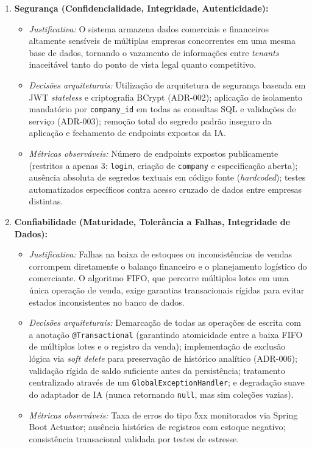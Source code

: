 \documentclass[12pt,a4paper]{article}
\begin{document}
\begin{enumerate}
    \item \textbf{Segurança (Confidencialidade, Integridade, Autenticidade):}
    \begin{itemize}
        \item \textit{Justificativa:} O sistema armazena dados comerciais e financeiros altamente sensíveis de múltiplas empresas concorrentes em uma mesma base de dados, tornando o vazamento de informações entre \textit{tenants} inaceitável tanto do ponto de vista legal quanto competitivo.
        \item \textit{Decisões arquiteturais:} Utilização de arquitetura de segurança baseada em JWT \textit{stateless} e criptografia BCrypt (ADR-002); aplicação de isolamento mandatório por \texttt{company\_id} em todas as consultas SQL e validações de serviço (ADR-003); remoção total do segredo padrão inseguro da aplicação e fechamento de endpoints expostos da IA.
        \item \textit{Métricas observáveis:} Número de endpoints expostos publicamente (restritos a apenas 3: \texttt{login}, criação de \texttt{company} e especificação aberta); ausência absoluta de segredos textuais em código fonte (\textit{hardcoded}); testes automatizados específicos contra acesso cruzado de dados entre empresas distintas.
    \end{itemize}

    \item \textbf{Confiabilidade (Maturidade, Tolerância a Falhas, Integridade de Dados):}
    \begin{itemize}
        \item \textit{Justificativa:} Falhas na baixa de estoques ou inconsistências de vendas corrompem diretamente o balanço financeiro e o planejamento logístico do comerciante. O algoritmo FIFO, que percorre múltiplos lotes em uma única operação de venda, exige garantias transacionais rígidas para evitar estados inconsistentes no banco de dados.
        \item \textit{Decisões arquiteturais:} Demarcação de todas as operações de escrita com a anotação \texttt{@Transactional} (garantindo atomicidade entre a baixa FIFO de múltiplos lotes e o registro da venda); implementação de exclusão lógica via \textit{soft delete} para preservação de histórico analítico (ADR-006); validação rígida de saldo suficiente antes da persistência; tratamento centralizado através de um \texttt{GlobalExceptionHandler}; e degradação suave do adaptador de IA (nunca retornando \texttt{null}, mas sim coleções vazias).
        \item \textit{Métricas observáveis:} Taxa de erros do tipo 5xx monitorados via Spring Boot Actuator; ausência histórica de registros com estoque negativo; consistência transacional validada por testes de estresse.
    \end{itemize}
\end{enumerate}
\end{document}
